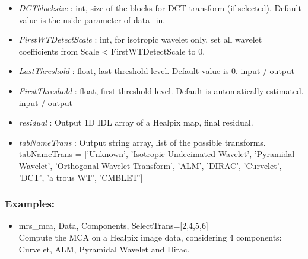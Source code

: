 \begin{itemize}
\item {\em DCTblocksize} : int, size of the blocks for DCT transform (if selected). Default value is the nside parameter of data\_in.
\item {\em FirstWTDetectScale} : int, for isotropic wavelet only, set all wavelet coefficients from Scale < FirstWTDetectScale to 0.
\item {\em LastThreshold} : float, last threshold level. Default value is 0. input / output
\item {\em FirstThreshold} : float, first threshold level. Default is automatically estimated. input / output
\item {\em residual} : Output 1D IDL array of a Healpix map, final residual.
\item {\em tabNameTrans} : Output string array, list of the possible transforms.
tabNameTrans = ['Unknown', 'Isotropic Undecimated Wavelet', 'Pyramidal Wavelet', 'Orthogonal Wavelet Transform', 'ALM', 'DIRAC', 'Curvelet', 'DCT', 'a trous WT', 'CMBLET']
\end{itemize}

\subsubsection*{Examples:} 
\begin{itemize}
\item mrs\_mca, Data, Components, SelectTrans=[2,4,5,6] \\
Compute the MCA on a Healpix image data, considering 4 components: Curvelet, ALM, Pyramidal Wavelet and Dirac. 
\end{itemize}



